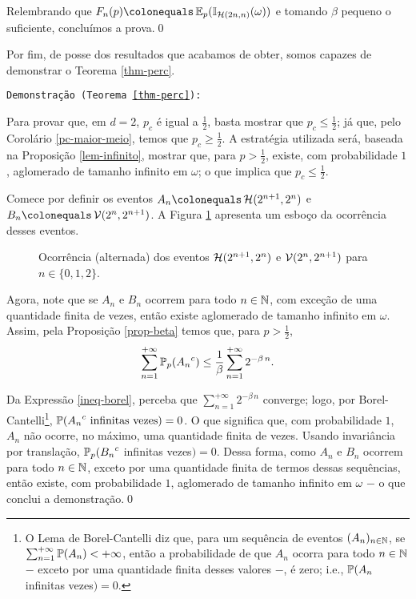 \par Relembrando que $F_n(p) \colonequals \EX_p(\IX_{\HL(2n, n)}(\omega))$ e tomando $\beta$ pequeno o suficiente, concluímos a prova.\hspace{\fill}\qed

\par Por fim, de posse dos resultados que acabamos de obter, somos capazes de demonstrar o Teorema \ref{thm-perc}.

\par \texttt{Demonstração (Teorema \ref{thm-perc}):}

\par Para provar que, em $d = 2$, $p_c$ é igual a $\frac{1}{2}$, basta mostrar que $p_c \leq \frac{1}{2}$; já que, pelo Corolário \ref{pc-maior-meio}, temos que $p_c \geq \frac{1}{2}$. A estratégia utilizada será, baseada na Proposição \ref{lem-infinito}, mostrar que, para $p > \frac{1}{2}$, existe, com probabilidade $1$, aglomerado de tamanho infinito em $\omega$; o que implica que $p_c \leq \frac{1}{2}$. 

\par Comece por definir os eventos $A_n \colonequals \HL(2^{n+1}, 2^n)$ e $B_n \colonequals \VL(2^n, 2^{n+1})$. A Figura \ref{fig-caixas-iteradas} apresenta um esboço da ocorrência desses eventos.

\begin{figure*}[!htbp]
	\centering
	
	\vspace{-12pt}
	\caption{Ocorrência (alternada) dos eventos $\operatorname{\mathcal{H}}(2^{n+1}, 2^n)$ e $\operatorname{\mathcal{V}}(2^n, 2^{n+1})$ para $n \in \{0, 1, 2\}$.}
	\label{fig-caixas-iteradas}
\end{figure*}

\par Agora, note que se $A_n$ e $B_n$ ocorrem para todo $n \in \operatorname{\mathbb{N}}$, com exceção de uma quantidade finita de vezes, então existe aglomerado de tamanho infinito em $\omega$. Assim, pela Proposição \ref{prop-beta} temos que, para $p > \frac{1}{2}$, 
\begin{align}\label{ineq-borel}
	\sum_{n = 1}^{+\infty}\operatorname{\mathbb{P}}_p({A_n}^c) \leq \frac{1}{\beta} \sum_{n = 1}^{+\infty} 2^{-\beta\,n}.
\end{align}

\par Da Expressão \eqref{ineq-borel}, perceba que $\sum_{n=1}^{+\infty}2^{-\beta\,n}$ converge; logo, por Borel-Cantelli\footnote{O Lema de Borel-Cantelli diz que, para um sequência de eventos $(A_n)_{n \in \operatorname{\mathbb{N}}}$, se $\sum_{n=1}^{+\infty}\operatorname{\mathbb{P}}(A_n) < +\infty$, então a probabilidade de que $A_n$ ocorra para todo $n \in \operatorname{\mathbb{N}}$ $-$ exceto por uma quantidade finita desses valores $-$, é zero; i.e., $\operatorname{\mathbb{P}}(A_n $ infinitas vezes$) = 0$.}, $\operatorname{\mathbb{P}}({A_n}^c \text{ infinitas vezes}) = 0$. O que significa que, com probabilidade $1$, $A_n$ não ocorre, no máximo, uma quantidade finita de vezes. Usando invariância por translação, $\operatorname{\mathbb{P}}_p({B_n}^c$ infinitas vezes$) = 0$. Dessa forma, como $A_n$ e $B_n$ ocorrem para todo $n \in \operatorname{\mathbb{N}}$, exceto por uma quantidade finita de termos dessas sequências, então existe, com probabilidade $1$, aglomerado de tamanho infinito em $\omega$ $-$ o que conclui a demonstração.\hspace{\fill}\qed